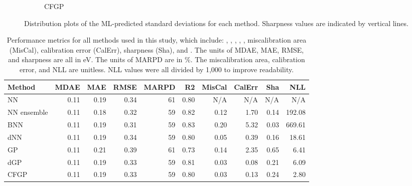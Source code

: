 \documentclass[]{achemso}
\begin{document}
\begin{figure}
\begin{subfigure}{0.32\textwidth}
        \caption{\gls{CFGP}}\label{fig:sharpness_cfgp}
    \end{subfigure}
    \caption{Distribution plots of the \gls{ML}-predicted standard deviations for each method.
    Sharpness values are indicated by vertical lines.}\label{fig:sharpness}
\end{figure}

\begin{table}
    \centering
    \begin{tabular}{lrrrrrrrrr}
        \toprule
        Method              & \gls{MDAE}    & \gls{MAE} & \gls{RMSE}    & \gls{MARPD}   & \gls{R2}  & MisCal    & CalErr    & Sha   & \gls{NLL} \\
        \midrule
        \gls{NN}            & 0.11          & 0.19      & 0.34          & 61            & 0.80      & N/A       & N/A       & N/A   & N/A \\
        \gls{NN} ensemble   & 0.11          & 0.18      & 0.32          & 59            & 0.82      & 0.12      & 1.70      & 0.14  & 192.08 \\
        \gls{BNN}           & 0.11          & 0.19      & 0.31          & 59            & 0.83      & 0.20      & 5.32      & 0.03  & 669.61 \\
        \gls{dNN}           & 0.11          & 0.19      & 0.34          & 59            & 0.80      & 0.05      & 0.39      & 0.16  & 18.61 \\
        \gls{GP}            & 0.11          & 0.21      & 0.39          & 61            & 0.73      & 0.14      & 2.35      & 0.65  & 6.41 \\
        \gls{dGP}           & 0.11          & 0.19      & 0.33          & 59            & 0.81      & 0.03      & 0.08      & 0.21  & 6.09 \\
        \gls{CFGP}          & 0.11          & 0.19      & 0.33          & 59            & 0.80      & 0.03      & 0.13      & 0.24  & 2.80 \\
        \bottomrule
    \end{tabular}
    \caption{Performance metrics for all methods used in this study, which include:
    , , , ,
    , miscalibration area (MisCal), calibration error (CalErr), sharpness (Sha), and .
    The units of \gls{MDAE}, \gls{MAE}, \gls{RMSE}, and sharpness are all in \gls{eV}.
    The units of \gls{MARPD} are in \%.
    The miscalibration area, calibration error, and \gls{NLL} are unitless.
    \gls{NLL} values were all divided by 1,000 to improve readability.}\label{tab:results}
\end{table}
\end{document}
